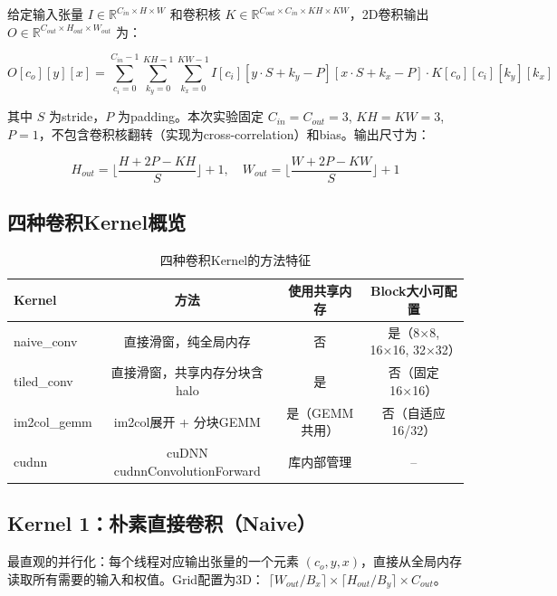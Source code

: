 \documentclass[UTF8,a4paper,12pt,fontset=none]{ctexart}
\begin{document}
给定输入张量 $I \in \mathbb{R}^{C_{in} \times H \times W}$ 和卷积核
$K \in \mathbb{R}^{C_{out} \times C_{in} \times KH \times KW}$，2D卷积输出
$O \in \mathbb{R}^{C_{out} \times H_{out} \times W_{out}}$ 为：

\begin{equation}
  O[c_o][y][x] = \sum_{c_i=0}^{C_{in}-1} \sum_{k_y=0}^{KH-1} \sum_{k_x=0}^{KW-1}
  I[c_i][y \cdot S + k_y - P][x \cdot S + k_x - P] \cdot K[c_o][c_i][k_y][k_x]
\end{equation}

其中 $S$ 为stride，$P$ 为padding。本次实验固定 $C_{in}=C_{out}=3$, $KH=KW=3$,
$P=1$，不包含卷积核翻转（实现为cross-correlation）和bias。输出尺寸为：

\begin{equation}
  H_{out} = \lfloor \frac{H + 2P - KH}{S} \rfloor + 1,
  \quad W_{out} = \lfloor \frac{W + 2P - KW}{S} \rfloor + 1
\end{equation}

\subsection{四种卷积Kernel概览}

\begin{table}[H]
  \centering
  \caption{四种卷积Kernel的方法特征}
  \label{tab:kernels}
  \begin{tabular}{lccc}
    \toprule
    Kernel & 方法 & 使用共享内存 & Block大小可配置 \\
    \midrule
    naive\_conv  & 直接滑窗，纯全局内存 & 否 & 是（8×8, 16×16, 32×32） \\
    tiled\_conv  & 直接滑窗，共享内存分块含halo & 是 & 否（固定16×16） \\
    im2col\_gemm & im2col展开 + 分块GEMM & 是（GEMM共用） & 否（自适应16/32） \\
    cudnn        & cuDNN cudnnConvolutionForward & 库内部管理 & -- \\
    \bottomrule
  \end{tabular}
\end{table}

\subsection{Kernel 1：朴素直接卷积（Naive）}

最直观的并行化：每个线程对应输出张量的一个元素 $(c_o, y, x)$，直接从全局内存
读取所有需要的输入和权值。Grid配置为3D：
$\lceil W_{out}/B_x \rceil \times \lceil H_{out}/B_y \rceil \times C_{out}$。
\end{document}
